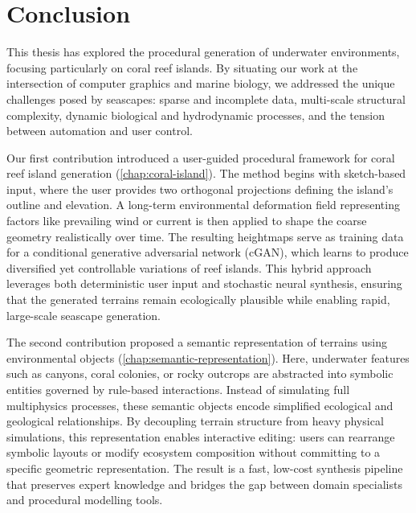 \chapter*{Conclusion}



This thesis has explored the procedural generation of underwater environments, focusing particularly on coral reef islands. By situating our work at the intersection of computer graphics and marine biology, we addressed the unique challenges posed by seascapes: sparse and incomplete data, multi-scale structural complexity, dynamic biological and hydrodynamic processes, and the tension between automation and user control.

Our first contribution introduced a user-guided procedural framework for coral reef island generation (\cref{chap:coral-island}). The method begins with sketch-based input, where the user provides two orthogonal projections defining the island's outline and elevation. A long-term environmental deformation field representing factors like prevailing wind or current is then applied to shape the coarse geometry realistically over time. The resulting heightmaps serve as training data for a conditional generative adversarial network (cGAN), which learns to produce diversified yet controllable variations of reef islands. This hybrid approach leverages both deterministic user input and stochastic neural synthesis, ensuring that the generated terrains remain ecologically plausible while enabling rapid, large-scale seascape generation.

The second contribution proposed a semantic representation of terrains using environmental objects (\cref{chap:semantic-representation}). Here, underwater features such as canyons, coral colonies, or rocky outcrops are abstracted into symbolic entities governed by rule-based interactions. Instead of simulating full multiphysics processes, these semantic objects encode simplified ecological and geological relationships. By decoupling terrain structure from heavy physical simulations, this representation enables interactive editing: users can rearrange symbolic layouts or modify ecosystem composition without committing to a specific geometric representation. The result is a fast, low-cost synthesis pipeline that preserves expert knowledge and bridges the gap between domain specialists and procedural modelling tools.

